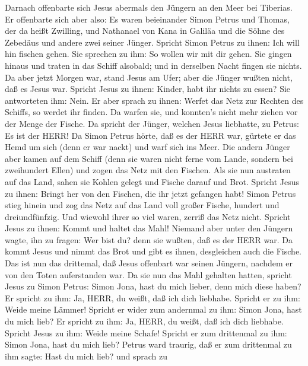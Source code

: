  Darnach offenbarte sich Jesus abermals den Jüngern an den
Meer bei Tiberias. Er offenbarte sich aber also:  Es waren
beieinander Simon Petrus und Thomas, der da heißt Zwilling, und
Nathanael von Kana in Galiläa und die Söhne des Zebedäus und andere zwei
seiner Jünger.  Spricht Simon Petrus zu ihnen: Ich will hin
fischen gehen. Sie sprechen zu ihm: So wollen wir mit dir gehen. Sie
gingen hinaus und traten in das Schiff alsobald; und in derselben Nacht
fingen sie nichts.  Da aber jetzt Morgen war, stand Jesus am
Ufer; aber die Jünger wußten nicht, daß es Jesus war. 
Spricht Jesus zu ihnen: Kinder, habt ihr nichts zu essen? Sie
antworteten ihm: Nein.  Er aber sprach zu ihnen: Werfet das
Netz zur Rechten des Schiffs, so werdet ihr finden. Da warfen sie, und
konnten's nicht mehr ziehen vor der Menge der Fische.  Da
spricht der Jünger, welchen Jesus liebhatte, zu Petrus: Es ist der HERR!
Da Simon Petrus hörte, daß es der HERR war, gürtete er das Hemd um sich
(denn er war nackt) und warf sich ins Meer.  Die andern
Jünger aber kamen auf dem Schiff (denn sie waren nicht ferne vom Lande,
sondern bei zweihundert Ellen) und zogen das Netz mit den Fischen.
 Als sie nun austraten auf das Land, sahen sie Kohlen gelegt
und Fische darauf und Brot.  Spricht Jesus zu ihnen: Bringt
her von den Fischen, die ihr jetzt gefangen habt!  Simon
Petrus stieg hinein und zog das Netz auf das Land voll großer Fische,
hundert und dreiundfünfzig. Und wiewohl ihrer so viel waren, zerriß das
Netz nicht.  Spricht Jesus zu ihnen: Kommt und haltet das
Mahl! Niemand aber unter den Jüngern wagte, ihn zu fragen: Wer bist du?
denn sie wußten, daß es der HERR war.  Da kommt Jesus und
nimmt das Brot und gibt es ihnen, desgleichen auch die Fische.
 Das ist nun das drittemal, daß Jesus offenbart war seinen
Jüngern, nachdem er von den Toten auferstanden war.  Da sie
nun das Mahl gehalten hatten, spricht Jesus zu Simon Petrus: Simon Jona,
hast du mich lieber, denn mich diese haben? Er spricht zu ihm: Ja, HERR,
du weißt, daß ich dich liebhabe. Spricht er zu ihm: Weide meine Lämmer!
 Spricht er wider zum andernmal zu ihm: Simon Jona, hast du
mich lieb? Er spricht zu ihm: Ja, HERR, du weißt, daß ich dich liebhabe.
Spricht Jesus zu ihm: Weide meine Schafe!  Spricht er zum
drittenmal zu ihm: Simon Jona, hast du mich lieb? Petrus ward traurig,
daß er zum drittenmal zu ihm sagte: Hast du mich lieb? und sprach zu
